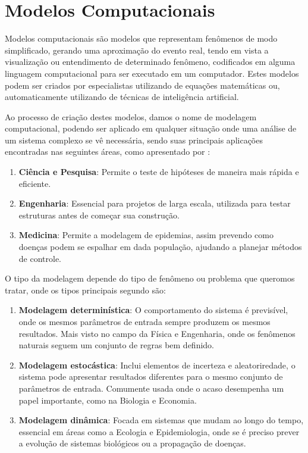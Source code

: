 \documentclass[
	12pt,				%
	openright,			%
	oneside,			%
	a4paper,			%
	english,			%
	brazil				%
	]{abntex2}
\begin{document}
\section{Modelos Computacionais}

Modelos computacionais são modelos que representam fenômenos de modo simplificado, gerando uma aproximação
do evento real, tendo em vista a visualização ou entendimento de determinado fenômeno, codificados em 
alguma linguagem computacional para ser executado em um computador. Estes modelos podem ser criados
por especialistas utilizando de equações matemáticas ou, automaticamente utilizando de técnicas de
inteligência artificial. \cite{modelos_computacionais}

Ao processo de criação destes modelos, damos o nome de modelagem computacional, podendo ser aplicado em
qualquer situação onde uma análise de um sistema complexo se vê necessária, sendo suas principais
aplicações encontradas nas seguintes áreas, como apresentado por \cite{modelagem_computacional}:

\begin{enumerate}
	\item \textbf{Ciência e Pesquisa}: Permite o teste de hipóteses de maneira mais rápida e eficiente.
	\item \textbf{Engenharia}: Essencial para projetos de larga escala, utilizada para testar estruturas antes de
	começar sua construção.
	\item \textbf{Medicina}: Permite a modelagem de epidemias, assim prevendo como doenças podem se espalhar em dada
	população, ajudando a planejar métodos de controle.
\end{enumerate}

O tipo da modelagem depende do tipo de fenômeno ou problema que queromos tratar, onde os tipos principais
segundo \cite{modelagem_computacional} são:

\begin{enumerate}
	\item \textbf{Modelagem determinística}: O comportamento do sistema é previsível, onde os mesmos parâmetros de 
	entrada sempre produzem os mesmos resultados. Mais visto no campo da Física e Engenharia, onde os 
	fenômenos naturais seguem um conjunto de regras bem definido.
	\item \textbf{Modelagem estocástica}: Inclui elementos de incerteza e aleatoriredade, o sistema pode apresentar
	resultados diferentes para o mesmo conjunto de parâmetros de entrada. Comumente usada onde o acaso 
	desempenha um papel importante, como na Biologia e Economia.
	\item \textbf{Modelagem dinâmica}: Focada em sistemas que mudam ao longo do tempo, essencial em áreas como a
	Ecologia e Epidemiologia, onde se é preciso prever a evolução de sistemas biológicos ou a propagação
	de doenças. 
\end{enumerate}
\end{document}
